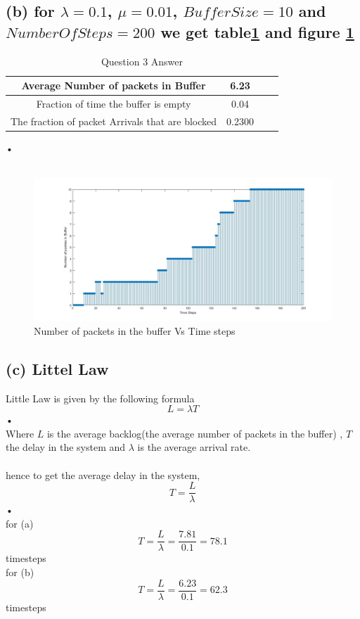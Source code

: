 \documentclass[a4paper,11pt]{article}
\begin{document}
\subsection*{(b) for $\lambda = 0.1$, $\mu=0.01$, $BufferSize=10$ and $NumberOf Steps=200$ we get table\ref{tab:q3b} and figure \ref{fig:q3b} }

\begin{table}
\centering

\begin{tabular}{ |c|c|c|c| } 
\hline
 Average Number of packets in Buffer& 6.23  \\
 \hline
 Fraction of time the buffer is empty& 0.04 \\
 \hline
 The fraction of packet Arrivals that are blocked& 0.2300\\
\hline
\end{tabular}
\caption{Question 3 Answer } \label{tab:q3b}
\end{table}•\\\\
\begin{figure}[h]
   \hspace*{-6cm}
    \includegraphics[scale=0.5]{q3_2}
    \caption{Number of packets in the buffer Vs Time steps}\label{fig:q3b}
\end{figure}
\subsection*{(c) Littel Law}
Little Law is given by the following formula \cite{text}\\
\begin{equation}
L = \lambda T
\end{equation}•\\
Where $L$ is the average backlog(the average number of packets in the buffer) , $T$ the delay in the system and $\lambda$ is the average arrival rate.\\\\
hence to get the average delay in the system,
\begin{equation}
T = \frac{L}{\lambda}
\end{equation}•\\
for (a) \\ $$T = \frac{L}{\lambda}=\frac{7.81}{0.1}=78.1$$ timesteps\\
for (b) \\ $$T = \frac{L}{\lambda}=\frac{6.23 }{0.1}=62.3$$ timesteps
\newpage
\end{document}
